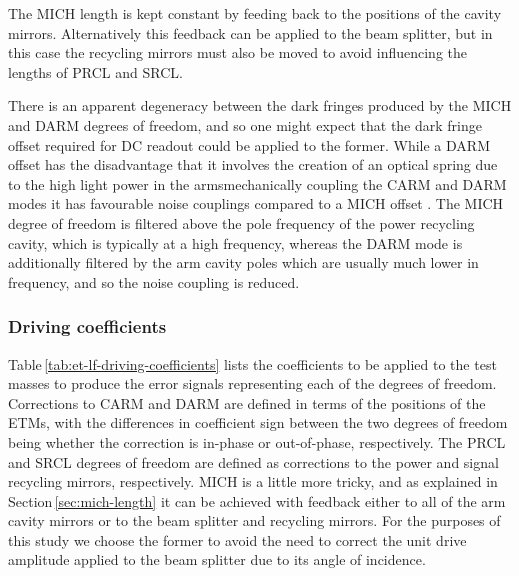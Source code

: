 The \gls{MICH} length is kept constant by feeding back to the positions of the cavity mirrors. Alternatively this feedback can be applied to the beam splitter, but in this case the recycling mirrors must also be moved to avoid influencing the lengths of \gls{PRCL} and \gls{SRCL}.

There is an apparent degeneracy between the dark fringes produced by the \gls{MICH} and \gls{DARM} degrees of freedom, and so one might expect that the dark fringe offset required for \gls{DC} readout could be applied to the former. While a \gls{DARM} offset has the disadvantage that it involves the creation of an optical spring due to the high light power in the arms\textemdash mechanically coupling the \gls{CARM} and \gls{DARM} modes \cite{Heidmann2011, Vostrosablin2014}\textemdash it has favourable noise couplings compared to a \gls{MICH} offset \cite{Vajente2011}. The \gls{MICH} degree of freedom is filtered above the pole frequency of the power recycling cavity, which is typically at a high frequency, whereas the \gls{DARM} mode is additionally filtered by the arm cavity poles which are usually much lower in frequency, and so the noise coupling is reduced.

\subsubsection{Driving coefficients}
Table\,\ref{tab:et-lf-driving-coefficients} lists the coefficients to be applied to the test masses to produce the error signals representing each of the degrees of freedom. Corrections to \gls{CARM} and \gls{DARM} are defined in terms of the positions of the \glspl{ETM}, with the differences in coefficient sign between the two degrees of freedom being whether the correction is in-phase or out-of-phase, respectively. The \gls{PRCL} and \gls{SRCL} degrees of freedom are defined as corrections to the power and signal recycling mirrors, respectively. \gls{MICH} is a little more tricky, and as explained in Section\,\ref{sec:mich-length} it can be achieved with feedback either to all of the arm cavity mirrors or to the beam splitter and recycling mirrors. For the purposes of this study we choose the former to avoid the need to correct the unit drive amplitude applied to the beam splitter due to its angle of incidence.

